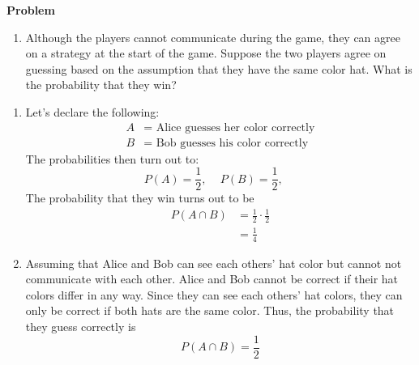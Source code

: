 \documentclass[12pt]{article}
\newenvironment{Ex}{\textbf{Problem}\vspace{.75em}\\}{}
\begin{document}
\begin{enumerate}
\begin{Ex}
\begin{enumerate}
    \item Although the players cannot communicate during the game,
      they can agree on a strategy at the start of the game. Suppose
      the two players agree on guessing based on the assumption that
      they have the same color hat. What is the probability that they
      win?
    \end{enumerate}
    \begin{solution} \hfill
      \begin{enumerate}
      \item Let's declare the following:
        \begin{equation}
          \label{eq:2-var-declaration}
          \begin{aligned}
            A &= \text{ Alice guesses her color correctly} \\
            B &= \text{ Bob guesses his color correctly}
          \end{aligned}
        \end{equation}
        The probabilities then turn out to:
        \begin{equation}
          \label{eq:1-prob-declaration}
          P(A) = \frac{1}{2} \text{, } \quad
          P(B) = \frac{1}{2} \text{, } \quad
        \end{equation}
        The probability that they win turns out to be
        \begin{equation}
          \label{eq:2a-answer}
          \begin{aligned}
            P(A \cap B) &= \frac{1}{2} \cdot \frac{1}{2} \\
            &= \frac{1}{4}
          \end{aligned}
        \end{equation}
      \item Assuming that Alice and Bob can see each others' hat color
        but cannot not communicate with each other. Alice and Bob
        cannot be correct if their hat colors differ in any way. Since
        they can see each others' hat colors, they can only be correct
        if both hats are the same color. Thus, the probability that
        they guess correctly is
        \begin{equation}
          \label{eq:2b-answer}
          P(A \cap B) = \frac{1}{2}
        \end{equation}
      \end{enumerate}
    \end{solution}
  \end{Ex}

\end{enumerate}
\end{document}
